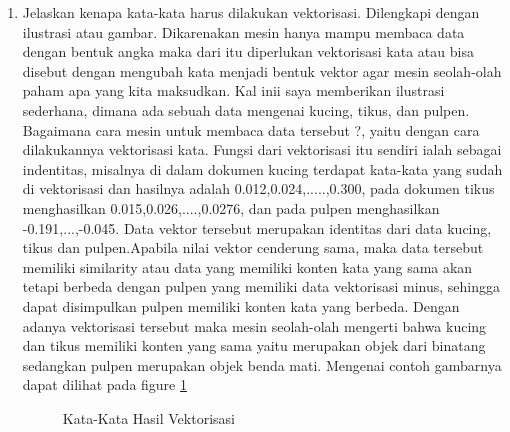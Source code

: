 \begin{enumerate}

\item Jelaskan kenapa kata-kata harus dilakukan vektorisasi. Dilengkapi dengan ilustrasi atau gambar.
	\subitem Dikarenakan mesin hanya mampu membaca data dengan bentuk angka maka dari itu diperlukan vektorisasi kata atau bisa disebut dengan mengubah kata menjadi bentuk vektor agar mesin seolah-olah paham apa yang kita maksudkan. Kal inii saya memberikan ilustrasi sederhana, dimana ada sebuah data mengenai kucing, tikus, dan pulpen. Bagaimana cara mesin untuk membaca data tersebut ?, yaitu dengan cara dilakukannya vektorisasi kata. Fungsi dari vektorisasi itu sendiri ialah sebagai indentitas, misalnya di dalam dokumen kucing terdapat kata-kata yang sudah di vektorisasi dan hasilnya adalah 0.012,0.024,.....,0.300, pada dokumen tikus menghasilkan 0.015,0.026,....,0.0276, dan pada pulpen menghasilkan -0.191,...,-0.045. Data vektor tersebut merupakan identitas dari data kucing, tikus dan pulpen.Apabila nilai vektor cenderung sama, maka data tersebut memiliki similarity atau data yang memiliki konten kata yang sama akan tetapi berbeda dengan pulpen yang memiliki data vektorisasi minus, sehingga dapat disimpulkan pulpen memiliki konten kata yang berbeda. Dengan adanya vektorisasi tersebut maka mesin seolah-olah mengerti bahwa kucing dan tikus memiliki konten yang sama yaitu merupakan objek dari binatang sedangkan pulpen merupakan objek benda mati. Mengenai contoh gambarnya dapat dilihat pada figure \ref{YNC5-1}

	\begin{figure}[ht]
		\caption{Kata-Kata Hasil Vektorisasi}
		\label{YNC5-1}
	\end{figure}


\end{enumerate}
